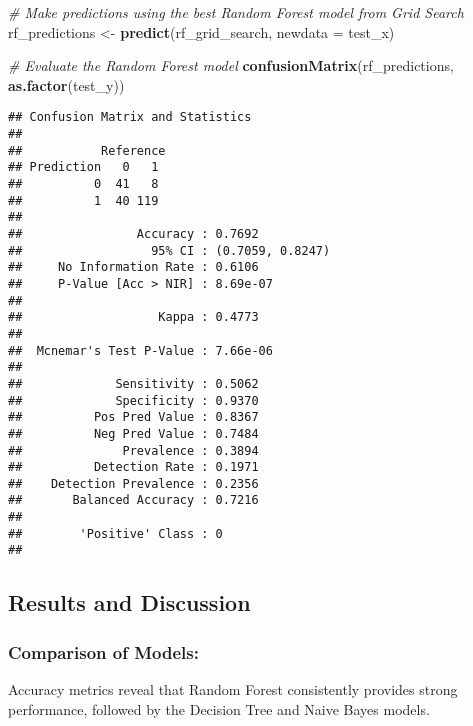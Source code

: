 \documentclass[
]{article}
\newenvironment{Shaded}{\begin{snugshade}}{\end{snugshade}}
\newcommand{\AttributeTok}[1]{\textcolor[rgb]{0.13,0.29,0.53}{#1}}
\newcommand{\CommentTok}[1]{\textcolor[rgb]{0.56,0.35,0.01}{\textit{#1}}}
\newcommand{\FunctionTok}[1]{\textcolor[rgb]{0.13,0.29,0.53}{\textbf{#1}}}
\newcommand{\NormalTok}[1]{#1}
\newcommand{\OtherTok}[1]{\textcolor[rgb]{0.56,0.35,0.01}{#1}}
\begin{document}
\begin{Shaded}
\begin{Highlighting}[]
\CommentTok{\# Make predictions using the best Random Forest model from Grid Search}
\NormalTok{rf\_predictions }\OtherTok{\textless{}{-}} \FunctionTok{predict}\NormalTok{(rf\_grid\_search, }\AttributeTok{newdata =}\NormalTok{ test\_x)}

\CommentTok{\# Evaluate the Random Forest model}
\FunctionTok{confusionMatrix}\NormalTok{(rf\_predictions, }\FunctionTok{as.factor}\NormalTok{(test\_y))}
\end{Highlighting}
\end{Shaded}

\begin{verbatim}
## Confusion Matrix and Statistics
## 
##           Reference
## Prediction   0   1
##          0  41   8
##          1  40 119
##                                           
##                Accuracy : 0.7692          
##                  95% CI : (0.7059, 0.8247)
##     No Information Rate : 0.6106          
##     P-Value [Acc > NIR] : 8.69e-07        
##                                           
##                   Kappa : 0.4773          
##                                           
##  Mcnemar's Test P-Value : 7.66e-06        
##                                           
##             Sensitivity : 0.5062          
##             Specificity : 0.9370          
##          Pos Pred Value : 0.8367          
##          Neg Pred Value : 0.7484          
##              Prevalence : 0.3894          
##          Detection Rate : 0.1971          
##    Detection Prevalence : 0.2356          
##       Balanced Accuracy : 0.7216          
##                                           
##        'Positive' Class : 0               
## 
\end{verbatim}

\hypertarget{results-and-discussion}{%
\subsection{Results and Discussion}\label{results-and-discussion}}

\hypertarget{comparison-of-models}{%
\subsubsection{Comparison of Models:}\label{comparison-of-models}}

Accuracy metrics reveal that Random Forest consistently provides strong
performance, followed by the Decision Tree and Naive Bayes models.
\end{document}
